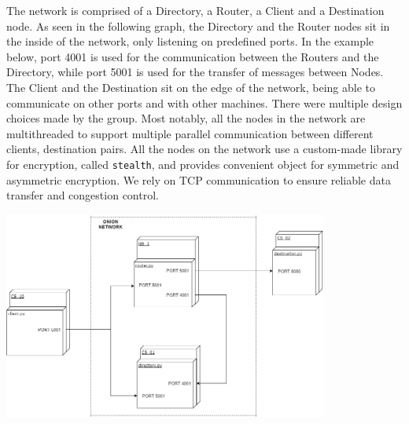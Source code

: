 \documentclass[10pt]{report}
\begin{document}
\noindent The network is comprised of a Directory, a Router, a Client and a Destination node. As
seen in the following graph, the Directory and the Router nodes sit in the inside of the
network, only listening on predefined ports. In the example below, port 4001 is used for the
communication between the Routers and the Directory, while port 5001 is used for the transfer of
messages between Nodes.  The Client and the Destination sit on the edge
of the network, being able to communicate on other ports and with other machines. There were
multiple design choices made by the group. Most notably, all the nodes in the network are
multithreaded to support multiple parallel communication between different clients, destination
pairs. All the nodes on the network use a custom-made library for encryption, called
\texttt{stealth}, and provides convenient object for symmetric and asymmetric encryption. We rely on
TCP communication to ensure reliable data transfer and congestion control. \\

\begin{center}
    \includegraphics[width=0.8\textwidth]{Deployment}    
\end{center}
\end{document}

